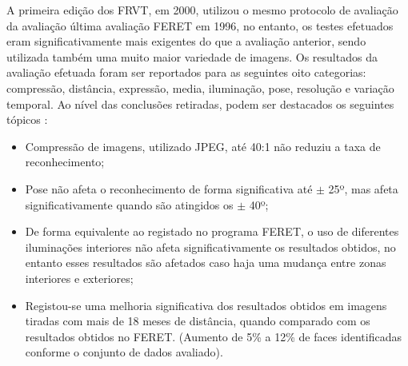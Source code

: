 A primeira edição dos FRVT, em 2000, utilizou o mesmo protocolo de avaliação da avaliação última avaliação FERET em 1996, no entanto, os testes efetuados eram significativamente mais exigentes do que a avaliação anterior, sendo utilizada também uma muito maior variedade de imagens. Os resultados da avaliação efetuada foram ser reportados para as seguintes oito categorias: compressão, distância, expressão,  media, iluminação, pose, resolução e variação temporal. Ao nível das conclusões retiradas, podem ser destacados os seguintes tópicos \cite{BlackburnDuaneM.;BoneMike;Phillips2001, Chellappa2010, Li2011}:
\begin{itemize}
\item Compressão de imagens, utilizado JPEG, até 40:1 não reduziu a taxa de reconhecimento;
\item Pose não afeta o reconhecimento de forma significativa até $\pm$ 25º, mas afeta significativamente quando são atingidos os $\pm$ 40º;
\item De forma equivalente ao registado no programa FERET, o uso de diferentes iluminações interiores não afeta significativamente os resultados obtidos, no entanto esses resultados são afetados caso haja uma mudança entre zonas interiores e exteriores;
\item Registou-se uma melhoria significativa dos resultados obtidos em imagens tiradas com mais de 18 meses de distância, quando comparado com os resultados obtidos no FERET. (Aumento de 5\% a 12\% de faces identificadas conforme o conjunto de dados avaliado).
\end{itemize}

